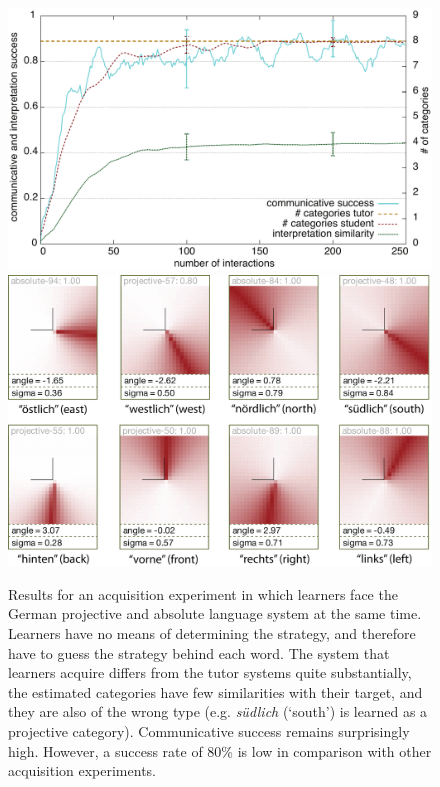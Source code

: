 \begin{figure} 
\begin{center}
\includegraphics[width=0.8\columnwidth]{figs/category-acquisition-projective+absolute-results+categories-1}
\includegraphics[width=0.8\columnwidth]{figs/category-acquisition-projective+absolute-results+categories-2.png}
\end{center}
\caption[Results for acquisition of projective and absolute systems]{%
Results for an acquisition experiment in which learners face 
the German projective and absolute language system at the same time. 
Learners have no means of determining the strategy, and therefore have 
to guess the strategy behind each word. The system that learners 
acquire differs from the tutor systems quite substantially, the estimated 
categories have few similarities with their target, and they are 
also of the wrong type (e.g. \textit{südlich} (`south') is learned as a projective category).
Communicative success remains surprisingly high. 
However, a success rate of 80\% is low in comparison with other acquisition experiments.}
\label{f:category-acquisition-projective+absolute-results}
\end{figure}


